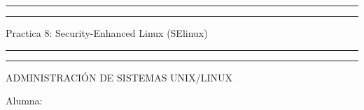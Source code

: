 \documentclass[a4paper, 11pt, oneside]{article}
\begin{document}
 

\begin{titlepage} 

	\centering 
	
	\scshape 
	
	\vspace*{\baselineskip} 
	
	
	
	\rule{\textwidth}{1.6pt}\vspace*{-\baselineskip}\vspace*{2pt} 
	\rule{\textwidth}{0.4pt} 
	
	\vspace{0.75\baselineskip} 
	
	{\LARGE Practica 8: Security-Enhanced Linux (SElinux)}	
	\vspace{0.75\baselineskip} 
	
	\rule{\textwidth}{0.4pt}\vspace*{-\baselineskip}\vspace{3.2pt}
	\rule{\textwidth}{1.6pt} 
	
	\vspace{2\baselineskip} 
	

	ADMINISTRACIÓN DE SISTEMAS UNIX/LINUX
	
	\vspace*{1\baselineskip} 
	
	
	
	Alumna:
	
	\vspace{0.2\baselineskip} 
	

\end{titlepage}
\end{document}
